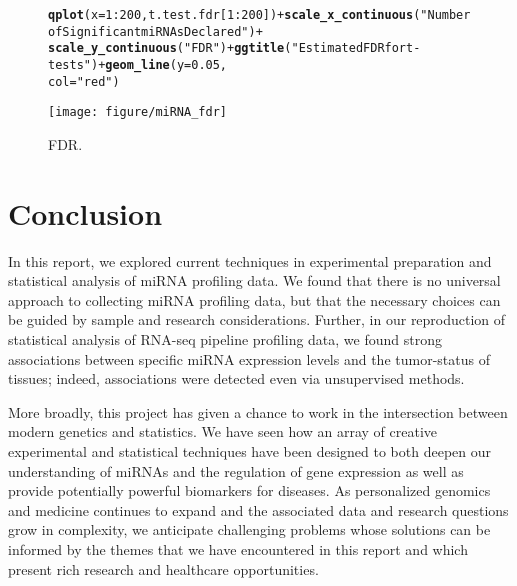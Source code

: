 \documentclass[12pt,english]{article}\usepackage{graphicx, color}
\makeatletter
\def\maxwidth{ %
  \ifdim\Gin@nat@width>\linewidth
    \linewidth
  \else
    \Gin@nat@width
  \fi
}
\newcommand{\hlfunctioncall}[1]{\textcolor[rgb]{0.501960784313725,0,0.329411764705882}{\textbf{#1}}}%
\newcommand{\hlstring}[1]{\textcolor[rgb]{0.6,0.6,1}{#1}}%
\newenvironment{kframe}{%
 \def\at@end@of@kframe{}%
 \ifinner\ifhmode%
  \def\at@end@of@kframe{\end{minipage}}%
  \begin{minipage}{\columnwidth}%
 \fi\fi%
 \def\FrameCommand##1{\hskip\@totalleftmargin \hskip-\fboxsep
 \colorbox{shadecolor}{##1}\hskip-\fboxsep
     \hskip-\linewidth \hskip-\@totalleftmargin \hskip\columnwidth}%
 \MakeFramed {\advance\hsize-\width
   \@totalleftmargin\z@ \linewidth\hsize
   \@setminipage}}%
 {\par\unskip\endMakeFramed%
 \at@end@of@kframe}
\newenvironment{knitrout}{}{} %
\numberwithin{equation}{section}
\numberwithin{figure}{section}
\theoremstyle{plain}
\theoremstyle{remark}
\makeatother
\begin{document}
\begin{spacing}{1}
  \begin{figure}
\begin{knitrout}
\color{fgcolor}\begin{kframe}
\begin{alltt}
\hlfunctioncall{qplot}(x = 1:200, t.test.fdr[1:200]) + \hlfunctioncall{scale_x_continuous}(\hlstring{"Number of Significant miRNAs Declared"}) + 
    \hlfunctioncall{scale_y_continuous}(\hlstring{"FDR"}) + \hlfunctioncall{ggtitle}(\hlstring{"Estimated FDR for t-tests"}) + \hlfunctioncall{geom_line}(y = 0.05, 
    col = \hlstring{"red"})
\end{alltt}
\end{kframe}
\texttt{[image: figure/miRNA\_fdr]} 

\end{knitrout}

\caption{FDR.}
\label{fig:fdr}
\end{figure}
\end{spacing}

\section{Conclusion}

In this report, we explored current techniques in
experimental preparation and statistical analysis of miRNA profiling
data. We found that there is no universal approach to collecting
miRNA profiling data, but that the necessary choices can be guided by
sample and research considerations. Further, in our reproduction of
statistical analysis of RNA-seq pipeline profiling data, we found
strong associations between specific miRNA expression levels and the
tumor-status of tissues; indeed, associations were detected even via
unsupervised methods.

More broadly, this project has given a chance to work in the
intersection between modern genetics and statistics. We have seen how
an array of creative experimental and statistical techniques have been
designed to both deepen our understanding of miRNAs and the regulation of
gene expression as well as provide potentially powerful biomarkers for
diseases. As personalized genomics and medicine
continues to expand and the associated data and research questions
grow in complexity, we anticipate challenging problems whose
solutions can be informed by the themes that we have encountered in
this report and which present rich research and healthcare
opportunities.



\end{document}
